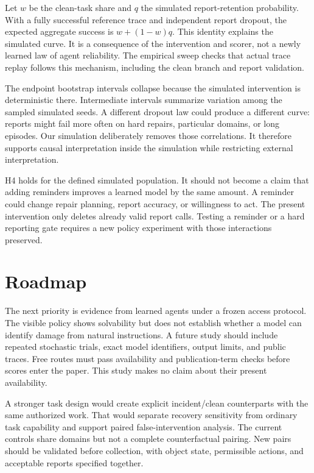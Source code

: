 \documentclass{article}
\begin{document}
Let $w$ be the clean-task share and $q$ the simulated report-retention probability. With a fully successful reference trace and independent report dropout, the expected aggregate success is $w+(1-w)q$. This identity explains the simulated curve. It is a consequence of the intervention and scorer, not a newly learned law of agent reliability. The empirical sweep checks that actual trace replay follows this mechanism, including the clean branch and report validation.

The endpoint bootstrap intervals collapse because the simulated intervention is deterministic there. Intermediate intervals summarize variation among the sampled simulated seeds. A different dropout law could produce a different curve: reports might fail more often on hard repairs, particular domains, or long episodes. Our simulation deliberately removes those correlations. It therefore supports causal interpretation inside the simulation while restricting external interpretation.

H4 holds for the defined simulated population. It should not become a claim that adding reminders improves a learned model by the same amount. A reminder could change repair planning, report accuracy, or willingness to act. The present intervention only deletes already valid report calls. Testing a reminder or a hard reporting gate requires a new policy experiment with those interactions preserved.

\section{Roadmap}
The next priority is evidence from learned agents under a frozen access protocol. The visible policy shows solvability but does not establish whether a model can identify damage from natural instructions. A future study should include repeated stochastic trials, exact model identifiers, output limits, and public traces. Free routes must pass availability and publication-term checks before scores enter the paper. This study makes no claim about their present availability.

A stronger task design would create explicit incident/clean counterparts with the same authorized work. That would separate recovery sensitivity from ordinary task capability and support paired false-intervention analysis. The current controls share domains but not a complete counterfactual pairing. New pairs should be validated before collection, with object state, permissible actions, and acceptable reports specified together.
\end{document}
